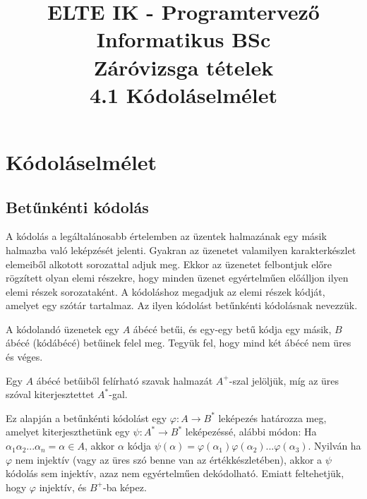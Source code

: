 \documentclass[margin=0px]{article}
\title{\textbf{{\Large ELTE IK - Programtervező Informatikus BSc} \vspace{0.2cm} \\ {\huge Záróvizsga tételek}} \vspace{0.3cm} \\ 4.1 Kódoláselmélet}
\author{}
\date{}
\begin{document}
\maketitle

\section{Kódoláselmélet}
\subsection{Betűnkénti kódolás}
A kódolás a legáltalánosabb értelemben az üzentek halmazának egy másik halmazba való leképzését jelenti. Gyakran az üzenetet valamilyen karakterkészlet elemeiből alkotott sorozattal adjuk meg. Ekkor az üzenetet felbontjuk előre rögzített olyan elemi részekre, hogy minden üzenet egyértelműen előálljon ilyen elemi részek sorozataként. A kódoláshoz megadjuk az elemi részek kódját, amelyet egy szótár tartalmaz. Az ilyen kódolást betűnkénti kódolásnak nevezzük.

A kódolandó üzenetek egy $A$ ábécé betűi, és egy-egy betű kódja egy másik, $B$ ábécé (kódábécé) betűinek felel meg. Tegyük fel, hogy mind két ábécé nem üres és véges.

Egy $A$ ábécé betűiből felírható szavak halmazát $A^+$-szal jelöljük, míg az üres szóval kiterjesztettet $A^*$-gal.

Ez alapján a betűnkénti kódolást egy $\varphi: A \rightarrow B^*$ leképezés határozza meg, amelyet kiterjeszthetünk egy $\psi: A^* \rightarrow B^*$ leképezéssé, alábbi módon: Ha $\alpha_1\alpha_2...\alpha_n = \alpha \in A$, akkor $\alpha$ kódja $\psi(\alpha) = \varphi(\alpha_1)\varphi(\alpha_2)...\varphi(\alpha_3)$. Nyilván ha $\varphi$ nem injektív (vagy az üres szó benne van az értékkészletében), akkor a $\psi$ kódolás sem injektív, azaz nem egyértelműen dekódolható. Emiatt feltehetjük, hogy $\varphi$ injektív, és $B^+$-ba képez.
\end{document}
